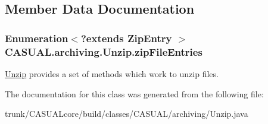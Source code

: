 \subsection{Member Data Documentation}
\hypertarget{class_c_a_s_u_a_l_1_1archiving_1_1_unzip_a00e829444ec7b41520e4e61972306b22}{
\subsubsection[{zip\-File\-Entries}]{\setlength{\rightskip}{0pt plus 5cm}Enumeration$<$?extends Zip\-Entry $>$ C\-A\-S\-U\-A\-L.\-archiving.\-Unzip.\-zip\-File\-Entries}}\label{class_c_a_s_u_a_l_1_1archiving_1_1_unzip_a00e829444ec7b41520e4e61972306b22}
\hyperlink{class_c_a_s_u_a_l_1_1archiving_1_1_unzip}{Unzip} provides a set of methods which work to unzip files. 

The documentation for this class was generated from the following file\-:\begin{DoxyCompactItemize}
\item 
trunk/\-C\-A\-S\-U\-A\-Lcore/build/classes/\-C\-A\-S\-U\-A\-L/archiving/Unzip.\-java\end{DoxyCompactItemize}
